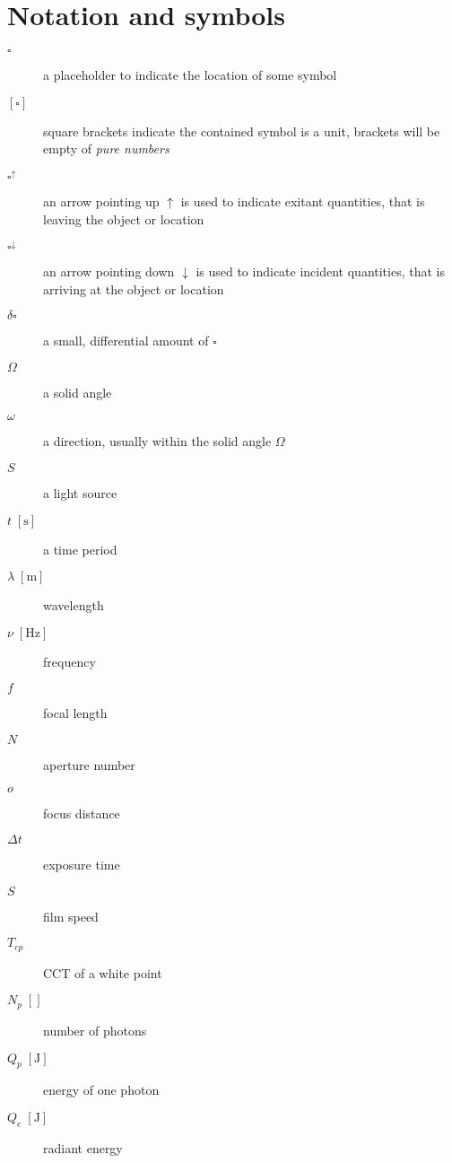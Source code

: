 
\chapter{Notation and symbols}\label{ch:notation}

\begin{description}
\item[ {$\square$} ] a placeholder to indicate the location of some symbol
\item[ {$[\square]$} ] square brackets indicate the contained symbol is a unit,
	brackets will be empty of \emph{pure numbers}
\item[ {$\square^\uparrow$} ] an arrow pointing up $\uparrow$ is used to indicate 
	exitant quantities, that is leaving the object or location
\item[ {$\square^\downarrow$} ] an arrow pointing down $\downarrow$ is used to indicate 
	incident quantities, that is arriving at the object or location

\item[ {$\delta\square$} ] a small, differential amount of $\square$

\item[{$\Omega$}] a solid angle
\item[{$\omega$}] a direction, usually within the solid angle $\Omega$
\item[$S$] a light source
\item[ {$t\;[\unit\second]$} ] a time period

\item[ {$\lambda\;[\unit\meter]$} ] wavelength
\item[ {$\nu\;[\unit\hertz]$} ] frequency

\item[{$f$}] focal length
\item[{$N$}] aperture number
\item[{$o$}] focus distance
\item[{$\Delta t$}] exposure time
\item[{$S$}] film speed
\item[{$T_{cp}$}] \gls{CCT} of a white point

\item[ {$N_p\;[]$} ] number of photons
\item[ {$Q_p\;[\unit\joule]$} ] energy of one photon
\item[ {$Q_e\;[\unit\joule]$} ] radiant energy


\end{description}
